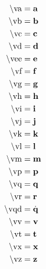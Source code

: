 \begin{subequations}
\begin{align}
\textrm{\textbackslash va}                  & = \textbf{a}                 \label{eqn:va} \\
\textrm{\textbackslash vb}                  & = \textbf{b}                 \label{eqn:vb} \\
\textrm{\textbackslash vc}                  & = \textbf{c}                 \label{eqn:vc} \\
\textrm{\textbackslash vd}                  & = \textbf{d}                 \label{eqn:vd} \\
\textrm{\textbackslash vee}                 & = \textbf{e}                \label{eqn:vee} \\
\textrm{\textbackslash vf}                  & = \textbf{f}                 \label{eqn:vf} \\
\textrm{\textbackslash vg}                  & = \textbf{g}                 \label{eqn:vg} \\
\textrm{\textbackslash vh}                  & = \textbf{h}                 \label{eqn:vh} \\
\textrm{\textbackslash vi}                  & = \textbf{i}                 \label{eqn:vi} \\
\textrm{\textbackslash vj}                  & = \textbf{j}                 \label{eqn:vj} \\
\textrm{\textbackslash vk}                  & = \textbf{k}                 \label{eqn:vk} \\
\textrm{\textbackslash vl}                  & = \textbf{l}                 \label{eqn:vl} \\
\textrm{\textbackslash vm}                  & = \textbf{m}                 \label{eqn:vm} \\
\textrm{\textbackslash vp}                  & = \textbf{p}                 \label{eqn:vp} \\
\textrm{\textbackslash vq}                  & = \textbf{q}                 \label{eqn:vq} \\
\textrm{\textbackslash vr}                  & = \textbf{r}                 \label{eqn:vr} \\
\textrm{\textbackslash vqd}                 & = \dot{\textbf{q}}                \label{eqn:vqd} \\
\textrm{\textbackslash vv}                  & = \textbf{v}                 \label{eqn:vv} \\
\textrm{\textbackslash vt}                  & = \textbf{t}                 \label{eqn:vt} \\
\textrm{\textbackslash vx}                  & = \textbf{x}                 \label{eqn:vx} \\
\textrm{\textbackslash vz}                  & = \textbf{z}                 \label{eqn:vz}
\end{align}
\end{subequations}

